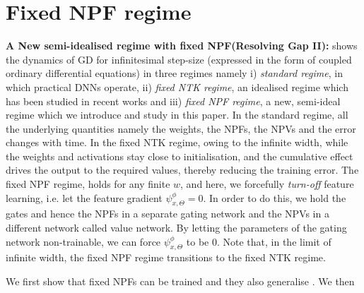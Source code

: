 \section{Fixed NPF regime}
\textbf{A New semi-idealised regime with fixed NPF(Resolving Gap II):}  shows the dynamics of GD for infinitesimal step-size (expressed in the form of coupled ordinary differential equations) in three regimes namely i) \emph{standard regime}, in  which practical DNNs operate, ii) \emph{fixed NTK regime}, an idealised regime which has been studied in recent works and iii) \emph{fixed NPF regime}, a new, semi-ideal regime which we introduce and study in this paper. In the standard regime, all the underlying quantities namely the weights, the NPFs, the NPVs and the error changes with time. In the fixed NTK regime, owing to the infinite width, while the weights and activations stay close to initialisation, and the cumulative effect drives the output to the required values, thereby reducing the training error. The fixed NPF regime, holds for any finite $w$, and here, we forcefully \emph{turn-off} feature learning, i.e. let the feature gradient $\psi^{\phi}_{x,\Theta}=0$. In order to do this, we hold the gates and hence the NPFs in a separate gating network and the NPVs in a different network called value network. By letting the parameters of the gating network non-trainable, we can force $\psi^{\phi}_{x,\Theta}$ to be $0$. Note that, in the limit of infinite width, the fixed NPF regime transitions to the fixed NTK regime. 
\FloatBarrier
\begin{table}[h]\centering
{}
\caption{Dynamics in various regimes. Here $p\in[P], s\in[n]$.}
\label{tb:dynamics}
\end{table}
We first show that fixed NPFs can be trained and they also generalise . We then

